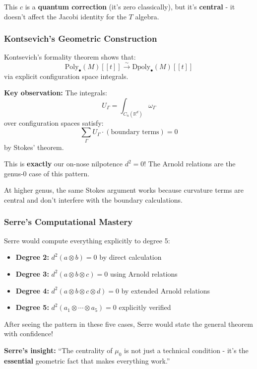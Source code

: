 This $c$ is a \textbf{quantum correction} (it's zero classically), but it's \textbf{central} - 
it doesn't affect the Jacobi identity for the $T$ algebra.

\subsubsection{Kontsevich's Geometric Construction}

Kontsevich's formality theorem \cite{Kontsevich-formality} shows that:
$$\text{Poly}_{\bullet}(M)[[t]] \xrightarrow{\sim} \text{Dpoly}_{\bullet}(M)[[t]]$$
via explicit configuration space integrals.

\textbf{Key observation:} The integrals:
$$U_\Gamma = \int_{C_n(\mathbb{R}^d)} \omega_\Gamma$$
over configuration spaces satisfy:
$$\sum_\Gamma U_\Gamma \cdot (\text{boundary terms}) = 0$$
by Stokes' theorem.

This is \textbf{exactly} our on-nose nilpotence $d^2 = 0$! The Arnold relations are the 
genus-0 case of this pattern.

At higher genus, the same Stokes argument works because curvature terms are central and don't 
interfere with the boundary calculations.

\subsubsection{Serre's Computational Mastery}

Serre would compute everything explicitly to degree 5:

\begin{itemize}
\item \textbf{Degree 2:} $d^2(a \otimes b) = 0$ by direct calculation
\item \textbf{Degree 3:} $d^2(a \otimes b \otimes c) = 0$ using Arnold relations
\item \textbf{Degree 4:} $d^2(a \otimes b \otimes c \otimes d) = 0$ by extended Arnold relations
\item \textbf{Degree 5:} $d^2(a_1 \otimes \cdots \otimes a_5) = 0$ explicitly verified
\end{itemize}

After seeing the pattern in these five cases, Serre would state the general theorem with confidence!

\textbf{Serre's insight:} ``The centrality of $\mu_0$ is not just a technical condition - 
it's the \textbf{essential} geometric fact that makes everything work.''

